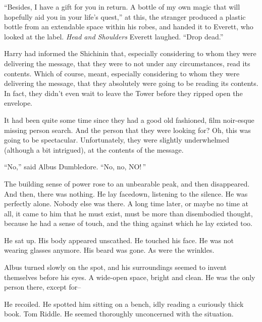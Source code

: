 “Besides, I have a gift for you in return. A bottle of my own magic that will hopefully aid you in your life’s quest,” at this, the stranger produced a plastic bottle from an extendable space within his robes, and handed it to Everett, who looked at the label.
\SomeVSpace
\textit{Head and Shoulders}
\SomeVSpace
Everett laughed. “Drop dead.”
\simpleline


Harry had informed the Shichinin that, especially considering to whom they were delivering the message, that they were to not under any circumstances, read its contents. Which of course, meant, especially considering to whom they were delivering the message, that they absolutely were going to be reading its contents. In fact, they didn’t even wait to leave the Tower before they ripped open the envelope.

It had been quite some time since they had a good old fashioned, film noir-esque missing person search. And the person that they were looking for? Oh, this was going to be spectacular. Unfortunately, they were slightly underwhelmed (although a bit intrigued), at the contents of the message.
\begin{writtenNote}
\end{writtenNote}
\simpleline
{}

“No,” said Albus Dumbledore. “No, no, NO! ”

The building sense of power rose to an unbearable peak, and then disappeared.
\SmallVSpace
And then, there was nothing.
\SmallVSpace
He lay facedown, listening to the silence. He was perfectly alone. Nobody else was there. A long time later, or maybe no time at all, it came to him that he must exist, must be more than disembodied thought, because he had a sense of touch, and the thing against which he lay existed too.

He sat up. His body appeared unscathed. He touched his face. He was not wearing glasses anymore. His beard was gone. As were the wrinkles.

Albus turned slowly on the spot, and his surroundings seemed to invent themselves before his eyes. A wide-open space, bright and clean. He was the only person there, except for–

He recoiled. He spotted him sitting on a bench, idly reading a curiously thick book. Tom Riddle. He seemed thoroughly unconcerned with the situation.

